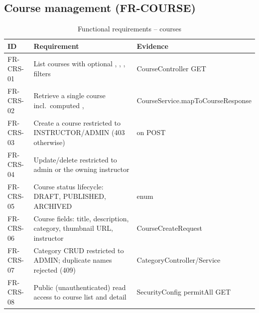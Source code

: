 \subsection{Course management (FR-COURSE)}
\begin{table}[H]
\centering
\caption{Functional requirements -- courses}
\label{tab:fr-course}
\begin{tabular}{@{}C{1.5cm}L{8.6cm}L{3.9cm}@{}}
\toprule
\textbf{ID} & \textbf{Requirement} & \textbf{Evidence} \\
\midrule
FR-CRS-01 & List courses with optional , , ,  filters & CourseController GET \\
FR-CRS-02 & Retrieve a single course incl.\ computed ,  & CourseService.mapToCourseResponse \\
FR-CRS-03 & Create a course restricted to INSTRUCTOR/ADMIN (403 otherwise) &  on POST \\
FR-CRS-04 & Update/delete restricted to admin or the owning instructor &  \\
FR-CRS-05 & Course status lifecycle: DRAFT, PUBLISHED, ARCHIVED &  enum \\
FR-CRS-06 & Course fields: title, description, category, thumbnail URL, instructor & CourseCreateRequest \\
FR-CRS-07 & Category CRUD restricted to ADMIN; duplicate names rejected (409) & CategoryController/Service \\
FR-CRS-08 & Public (unauthenticated) read access to course list and detail & SecurityConfig permitAll GET \\
\bottomrule
\end{tabular}
\end{table}

